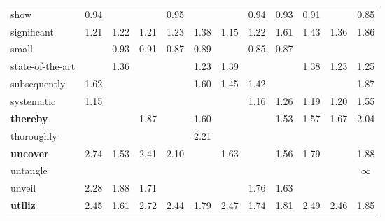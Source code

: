 \begin{tabular}{|l|c|c|c|c|c|c|c|c|c|c|c|}
show & \cellcolor{red!12} 0.94 &  &  & \cellcolor{red!10} 0.95 &  &  & \cellcolor{red!12} 0.94 & \cellcolor{red!14} 0.93 & \cellcolor{red!18} 0.91 &  & \cellcolor{red!31} 0.85 \\
significant & \cellcolor{green!10} 1.21 & \cellcolor{green!11} 1.22 & \cellcolor{green!10} 1.21 & \cellcolor{green!11} 1.23 & \cellcolor{green!17} 1.38 & \cellcolor{green!7} 1.15 & \cellcolor{green!11} 1.22 & \cellcolor{green!26} 1.61 & \cellcolor{green!19} 1.43 & \cellcolor{green!17} 1.36 & \cellcolor{green!34} 1.86 \\
small &  & \cellcolor{red!14} 0.93 & \cellcolor{red!18} 0.91 & \cellcolor{red!27} 0.87 & \cellcolor{red!22} 0.89 &  & \cellcolor{red!31} 0.85 & \cellcolor{red!27} 0.87 &  &  &  \\
state-of-the-art &  & \cellcolor{green!17} 1.36 &  &  & \cellcolor{green!11} 1.23 & \cellcolor{green!18} 1.39 &  &  & \cellcolor{green!17} 1.38 & \cellcolor{green!11} 1.23 & \cellcolor{green!12} 1.25 \\
subsequently & \cellcolor{green!26} 1.62 &  &  &  & \cellcolor{green!26} 1.60 & \cellcolor{green!20} 1.45 & \cellcolor{green!19} 1.42 &  &  &  & \cellcolor{green!34} 1.87 \\
systematic & \cellcolor{green!7} 1.15 &  &  &  &  &  & \cellcolor{green!8} 1.16 & \cellcolor{green!12} 1.26 & \cellcolor{green!9} 1.19 & \cellcolor{green!10} 1.20 & \cellcolor{green!24} 1.55 \\
\textbf{thereby} &  &  & \cellcolor{green!34} 1.87 &  & \cellcolor{green!26} 1.60 &  &  & \cellcolor{green!23} 1.53 & \cellcolor{green!25} 1.57 & \cellcolor{green!28} 1.67 & \cellcolor{green!39} 2.04 \\
thoroughly &  &  &  &  & \cellcolor{green!44} 2.21 &  &  &  &  &  &  \\
\textbf{uncover} & \cellcolor{green!56} 2.74 & \cellcolor{green!23} 1.53 & \cellcolor{green!49} 2.41 & \cellcolor{green!41} 2.10 &  & \cellcolor{green!27} 1.63 &  & \cellcolor{green!24} 1.56 & \cellcolor{green!32} 1.79 &  & \cellcolor{green!35} 1.88 \\
untangle &  &  &  &  &  &  &  &  &  &  & \cellcolor{green!100} $\infty$ \\
unveil & \cellcolor{green!45} 2.28 & \cellcolor{green!35} 1.88 & \cellcolor{green!29} 1.71 &  &  &  & \cellcolor{green!31} 1.76 & \cellcolor{green!27} 1.63 &  &  &  \\
\textbf{utiliz} & \cellcolor{green!50} 2.45 & \cellcolor{green!26} 1.61 & \cellcolor{green!55} 2.72 & \cellcolor{green!49} 2.44 & \cellcolor{green!32} 1.79 & \cellcolor{green!50} 2.47 & \cellcolor{green!30} 1.74 & \cellcolor{green!33} 1.81 & \cellcolor{green!50} 2.49 & \cellcolor{green!50} 2.46 & \cellcolor{green!34} 1.85 \\

\end{tabular}
